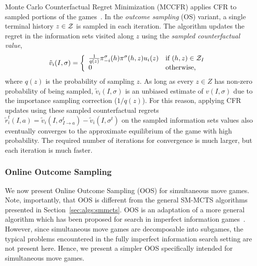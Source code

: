 Monte Carlo Counterfactual Regret Minimization (MCCFR) applies CFR to sampled portions of the games~\cite{Lanctot09Sampling}.
In the {\it outcome sampling} (OS) variant, a single terminal history $z\in \mathcal{Z}$ is sampled in each iteration.
The algorithm updates the regret in the information sets visited along $z$ using the
{\it sampled counterfactual value},
\begin{equation}
\tilde{v}_i(I,\sigma) = \left\{
\begin{array}{ll}
\frac{1}{q(z)} \pi^{\sigma}_{-i}(h) \pi^{\sigma}(h,z) u_i(z) & \mbox{if } (h,z) \in \mathcal{Z}_I\\
0  & \mbox{otherwise,}
\end{array} \right.
\label{eq:scv}
\end{equation}
where $q(z)$ is the probability of sampling $z$.
As long as every $z \in Z$ has non-zero probability of being sampled, $\tilde{v}_i(I,\sigma)$ is an unbiased estimate of $v(I,\sigma)$
due to the importance sampling correction ($1/q(z)$). For this reason, applying CFR updates using these sampled counterfactual regrets
$\tilde{r}_i^t(I,a) = \tilde{v}_i(I,\sigma^t_{I \rightarrow a}) - \tilde{v}_i(I,\sigma^t)$
on the sampled information sets values also eventually converges to the approximate equilibrium of the game with high probability.
The required number of iterations for convergence is much larger, but each iteration is much faster.



\subsubsection{Online Outcome Sampling} \label{sec:oos}

We now present Online Outcome Sampling (OOS) for simultaneous move games. Note, importantly, that OOS is different from the general SM-MCTS
algorithms presented in Section~\ref{sec:algs:smmcts}. OOS is an adaptation of a more general
algorithm which has been proposed for search in imperfect information games~\cite{15aamas-iioos}. However, since simultaneous move games are
decomposable into subgames, the typical problems encountered in the fully imperfect information search setting are not present here. Hence, we present
a simpler OOS specifically intended for simultaneous move games.

